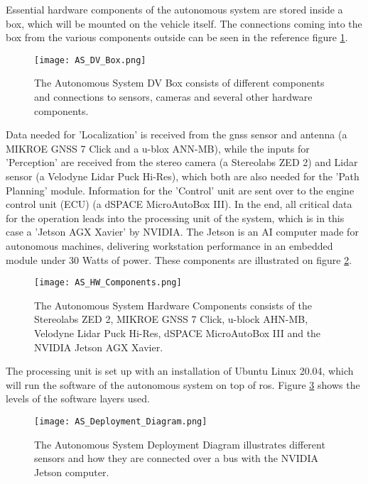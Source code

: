 Essential hardware components of the autonomous system are stored inside a box, which will be mounted on the vehicle itself. The connections coming into the box from the various components outside can be seen in the reference figure \ref{fig:AS DV Box}.

\begin{figure}[H]
    \centering
    \texttt{[image: AS\_DV\_Box.png]}
    \caption{The Autonomous System DV Box consists of different components and connections to sensors, cameras and several other hardware components.}
    \label{fig:AS DV Box}
\end{figure}

Data needed for 'Localization' is received from the \acrshort{gnss} sensor and antenna (a MIKROE GNSS 7 Click and a u-blox ANN-MB), while the inputs for 'Perception' are received from the stereo camera (a Stereolabs ZED 2) and Lidar sensor (a Velodyne Lidar Puck Hi-Res), which both are also needed for the 'Path Planning' module. Information for the 'Control' unit are sent over to the engine control unit (ECU) (a dSPACE MicroAutoBox III). In the end, all critical data for the operation leads into the processing unit of the system, which is in this case a 'Jetson AGX Xavier' by NVIDIA. The Jetson is an AI computer made for autonomous machines, delivering workstation performance in an embedded module under 30 Watts of power. These components are illustrated on figure \ref{fig:AS HW Components}.
\begin{figure}[H]
    \centering
    \texttt{[image: AS\_HW\_Components.png]}
    \caption{The Autonomous System Hardware Components consists of the Stereolabs ZED 2, MIKROE GNSS 7 Click, u-block AHN-MB, Velodyne Lidar Puck Hi-Res, dSPACE MicroAutoBox III and the NVIDIA Jetson AGX Xavier.}
    \label{fig:AS HW Components}
\end{figure}

The processing unit is set up with an installation of Ubuntu Linux 20.04, which will run the software of the autonomous system on top of \acrshort{ros}. Figure \ref{fig:AS Deployment Diagram} shows the levels of the software layers used.
\begin{figure}[H]
    \centering
    \texttt{[image: AS\_Deployment\_Diagram.png]}
    \caption{The Autonomous System Deployment Diagram illustrates different sensors and how they are connected over a bus with the NVIDIA Jetson computer.}
    \label{fig:AS Deployment Diagram}
\end{figure}

